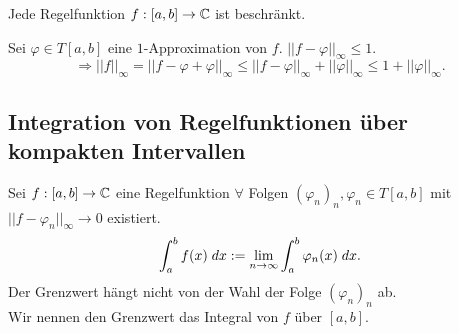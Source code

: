 \documentclass[../ana2.tex]{subfiles}
\begin{document}
\begin{kor}
    Jede Regelfunktion \( \abb{f}{[a,b]}{\C} \) 
    ist beschränkt. 
\end{kor}
\begin{bew}
    Sei \( \varphi \in T[a,b] \) eine \(1\)-Approximation 
    von \( f \). \( ||f - \varphi||_\infty \leq 1 \).
    \[ \Rightarrow ||f||_\infty 
    = || f - \varphi + \varphi ||_\infty 
    \leq ||f - \varphi||_\infty + ||\varphi||_\infty 
    \leq 1 + ||\varphi||_\infty. \]
\end{bew}
\subsection{Integration von Regelfunktionen 
über kompakten Intervallen}
\begin{satzdefi}
    Sei \( \abb{f}{[a,b]}{\C} \) eine Regelfunktion
    \( \forall \) Folgen \( (\varphi_n)_n, \varphi_n \in T[a,b] \)
    mit \( ||f - \varphi_n||_\infty \rightarrow 0 \) existiert.
    \[ \integral{f(x)}{a}{b} 
    := \limes{n} \integral{\varphi_n(x)}{a}{b}. \]
    Der Grenzwert hängt nicht von der Wahl der Folge
    \( (\varphi_n)_n \) ab.\\
    Wir nennen den Grenzwert das Integral von 
    \( f \) über \( [a,b] \).
\end{satzdefi}
\end{document}
